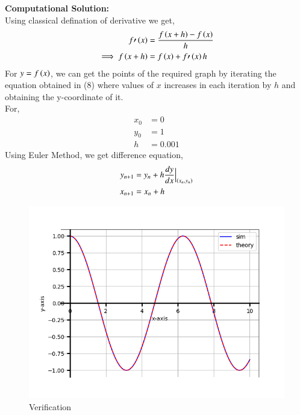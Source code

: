 \documentclass[journal]{IEEEtran}
\begin{document}
\textbf{Computational Solution:}\\
Using classical defination of derivative we get,\\
\begin{align}
    f\prime\left(x\right) &= \frac{f\left(x+h\right)-f\left(x\right)}{h}\\
    \implies f\left(x+h\right) &= f\left(x\right) + f\prime\left(x\right)h
\end{align}
For  $y = f\left(x\right)$, we can get the  points of the required graph by iterating the equation obtained in (8) where values of $x$ increases in each iteration by $h$ and obtaining the y-coordinate of it.\\
For,
\begin{align}
x_0 &= 0\\
y_0 &= 1\\
h &= 0.001
\end{align}
Using Euler Method, we get difference equation,
\begin{align}
y_{n+1} &= y_n + h\frac{dy}{dx}\Big|_{\left(x_n,y_n\right)}\\
x_{n+1} &= x_n + h
\end{align}

\begin{figure}[h]  %
    \centering  %
    \includegraphics[width=\columnwidth]{fig/Figure_1.png}  
    \caption{Verification}
    \label{fig:example}  %
\end{figure}
 
\end{document}
